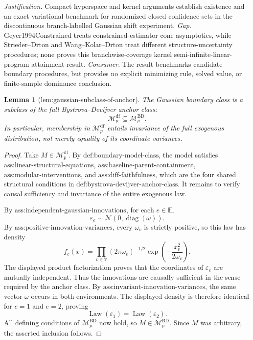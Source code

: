 \documentclass{article}
\newtheorem{lemma}{Lemma}
\begin{document}
\par\smallskip\noindent \textit{Justification.} Compact hyperspace and kernel arguments establish existence and an exact variational benchmark for randomized closed confidence sets in the discontinuous branch-labelled Gaussian shift experiment. \textit{Gap.} Geyer1994Constrained treats constrained-estimator cone asymptotics, while Strieder--Drton and Wang--Kolar--Drton treat different structure-uncertainty procedures; none proves this branchwise-coverage kernel semi-infinite-linear-program attainment result. \textit{Consumer.} The result benchmarks candidate boundary procedures, but provides no explicit minimizing rule, solved value, or finite-sample dominance conclusion.

\begin{lemma}[lem:gaussian-subclass-of-anchor]\label{lem:gaussian-subclass-of-anchor}
The Gaussian boundary class is a subclass of the full Bystrova--Devijver anchor class:
\[
 \mathcal M_p^{\mathrm{df}}\subseteq\mathcal M_p^{\mathrm{BD}}.
\]
In particular, membership in \(\mathcal M_p^{\mathrm{df}}\) entails invariance of the full exogenous distribution, not merely equality of its coordinate variances.
\end{lemma}
\begin{proof}
Take \(M\in\mathcal M_p^{\mathrm{df}}\).  By \(\text{def:boundary-model-class}\), the model satisfies \(\text{ass:linear-structural-equations}\), \(\text{ass:baseline-parent-containment}\), \(\text{ass:modular-interventions}\), and \(\text{ass:diff-faithfulness}\), which are the four shared structural conditions in \(\text{def:bystrova-devijver-anchor-class}\).  It remains to verify causal sufficiency and invariance of the entire exogenous law.

By \(\text{ass:independent-gaussian-innovations}\), for each \(e\in\mathbb E\),
\[
 \varepsilon_e\sim\mathcal N(0,\operatorname{diag}(\omega)).
\]
By \(\text{ass:positive-innovation-variances}\), every \(\omega_v\) is strictly positive, so this law has density
\[
 f_e(x)=\prod_{v\in\mathbb V}
 (2\pi\omega_v)^{-1/2}
 \exp\!\left(-\frac{x_v^2}{2\omega_v}\right).
\]
The displayed product factorization proves that the coordinates of \(\varepsilon_e\) are mutually independent.  Thus the innovations are causally sufficient in the sense required by the anchor class.  By \(\text{ass:invariant-innovation-variances}\), the same vector \(\omega\) occurs in both environments.  The displayed density is therefore identical for \(e=1\) and \(e=2\), proving
\[
 \operatorname{Law}(\varepsilon_1)=\operatorname{Law}(\varepsilon_2).
\]
All defining conditions of \(\mathcal M_p^{\mathrm{BD}}\) now hold, so \(M\in\mathcal M_p^{\mathrm{BD}}\).  Since \(M\) was arbitrary, the asserted inclusion follows.
\end{proof}
\end{document}
